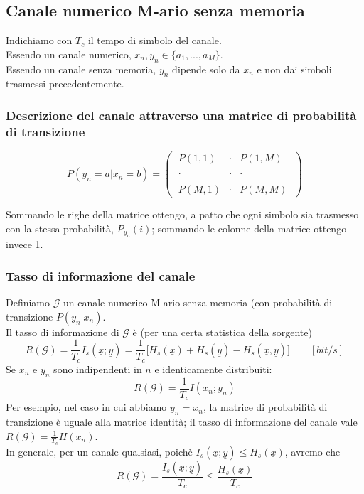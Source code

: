 \documentclass{article}
\begin{document}
\subsection{Canale numerico M-ario senza memoria}
Indichiamo con $T_c$ il tempo di simbolo del canale.\\
Essendo un canale numerico, $x_n, y_n\in\{a_1,...,a_M\}$.\\
Essendo un canale senza memoria, $y_n$ dipende solo da $x_n$ e non dai simboli trasmessi precedentemente.\\

\subsubsection{Descrizione del canale attraverso una matrice di probabilità di transizione}
$$P(y_n=a|x_n=b)=\left(\;\begin{array}{ccc}
	P(1,1)&\cdot&P(1,M)\\\\
	\cdot&\cdot&\cdot\\\\
	P(M,1)&\cdot&P(M,M)
\end{array}\;\right)$$

Sommando le righe della matrice ottengo, a patto che ogni simbolo sia trasmesso con la stessa probabilità, $P_{y_n}(i)$; sommando le colonne della matrice ottengo invece 1.\\

\subsubsection{Tasso di informazione del canale}
Definiamo $\mathcal{G}$ un canale numerico M-ario senza memoria (con probabilità di transizione $P(y_n|x_n)$.\\
Il tasso di informazione di $\mathcal{G}$ è (per una certa statistica della sorgente) 
$$R(\mathcal{G})=\frac{1}{T_c}I_s(\underline{x};\underline{y})=\frac{1}{T_c}\big[H_s(\underline{x})+H_s(\underline{y})-H_s(\underline{x},\underline{y})\big]\qquad[bit/s]$$
Se $x_n$ e $y_n$ sono indipendenti in $n$ e identicamente distribuiti:
$$R(\mathcal{G})=\frac{1}{T_c}I(x_n;y_n)$$
Per esempio, nel caso in cui abbiamo $y_n=x_n$, la matrice di probabilità di transizione è uguale alla matrice identità; il tasso di informazione del canale vale $R(\mathcal{G})=\frac{1}{T_c}H(x_n)$.\\
In generale, per un canale qualsiasi, poichè $I_s(\underline{x};\underline{y})\leq H_s(\underline{x})$, avremo che $$R(\mathcal{G})=\frac{I_s(\underline{x};\underline{y})}{T_c}\leq\frac{H_s(\underline{x})}{T_c}$$
\end{document}

